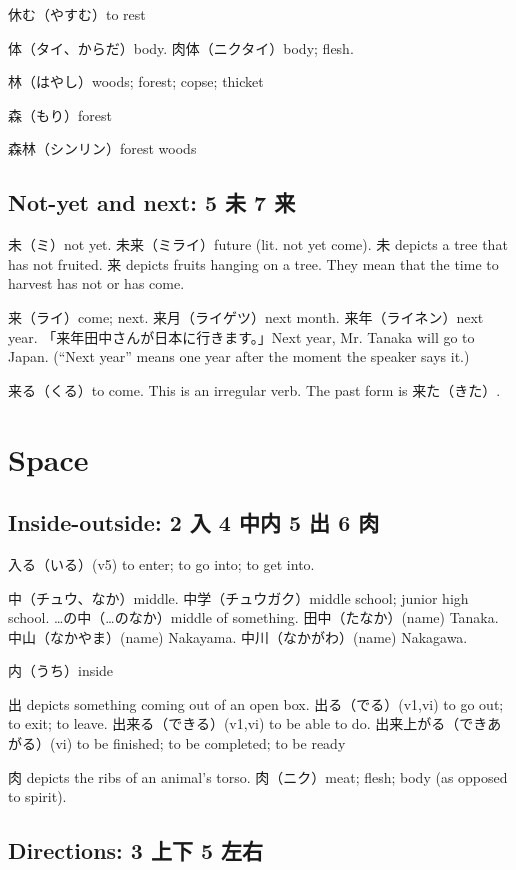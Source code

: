 休む（やすむ）to rest

体（タイ、からだ）body.
肉体（ニクタイ）body; flesh.

林（はやし）woods; forest; copse; thicket

森（もり）forest

森林（シンリン）forest woods

\subsection{Not-yet and next: 5 未 7 来}

未（ミ）not yet.
未来（ミライ）future (lit. not yet come).
未 depicts a tree that has not fruited.
来 depicts fruits hanging on a tree.
They mean that the time to harvest has not or has come.

来（ライ）come; next.
来月（ライゲツ）next month.
来年（ライネン）next year.
「来年田中さんが日本に行きます。」Next year, Mr. Tanaka will go to Japan.
(``Next year'' means one year after the moment the speaker says it.)

来る（くる）to come.
This is an irregular verb.
The past form is 来た（きた）.

\section{Space}

\subsection{Inside-outside: 2 入 4 中内 5 出 6 肉}

入る（いる）(v5)
to enter; to go into; to get into.

中（チュウ、なか）middle.
中学（チュウガク）middle school; junior high school.
…の中（…のなか）middle of something.
田中（たなか）(name) Tanaka.
中山（なかやま）(name) Nakayama.
中川（なかがわ）(name) Nakagawa.

内（うち）inside

出 depicts something coming out of an open box.
出る（でる）(v1,vi) to go out; to exit; to leave.
出来る（できる）(v1,vi) to be able to do.
出来上がる（できあがる）(vi) to be finished; to be completed; to be ready

肉 depicts the ribs of an animal's torso.
肉（ニク）meat; flesh; body (as opposed to spirit).

\subsection{Directions: 3 上下 5 左右}

